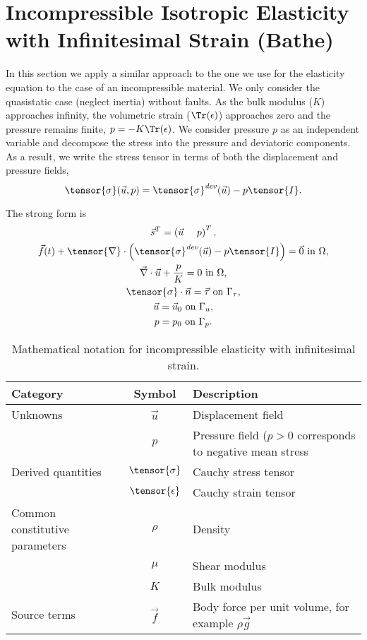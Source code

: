 \section{Incompressible Isotropic Elasticity with Infinitesimal Strain (Bathe)}

In this section we apply a similar approach to the one we use for the
elasticity equation to the case of an incompressible material. We only
consider the quasistatic case (neglect inertia) without faults. As the
bulk modulus ($K$) approaches infinity, the volumetric strain
($\Tr(\epsilon)$) approaches zero and the pressure remains finite,
$p = -K \Tr(\epsilon)$. We consider pressure $p$ as an independent
variable and decompose the stress into the pressure and deviatoric
components. As a result, we write the stress tensor in terms of both
the displacement and pressure fields,
\begin{equation}
  \tensor{\sigma}(\vec{u},p) = \tensor{\sigma}^\mathit{dev}(\vec{u}) - p\tensor{I}.
\end{equation}

The strong form is
\begin{gather}
  \vec{s}^T = \left( \vec{u} \quad \ p \right)^T, \\
  \vec{f}(t) + \tensor{\nabla} \cdot \left(\tensor{\sigma}^\mathit{dev}(\vec{u}) - p\tensor{I}\right) = \vec{0} \text{ in }\Omega, \\
  \vec{\nabla} \cdot \vec{u} + \frac{p}{K} = 0 \text{ in }\Omega, \\
  \tensor{\sigma} \cdot \vec{n} = \vec{\tau} \text{ on }\Gamma_\tau, \\
  \vec{u} = \vec{u}_0 \text{ on }\Gamma_u, \\
  p = p_0 \text{ on }\Gamma_p.
\end{gather}

\begin{table}[htbp]
  \caption{Mathematical notation for incompressible elasticity with
    infinitesimal strain.}
  \label{tab:notation:incompressible:elasticity}
  \begin{tabular}{lcp{3.5in}}
    \toprule
    {\bf Category} & {\bf Symbol} & {\bf Description} \\
    \midrule
    Unknowns & $\vec{u}$ & Displacement field \\
    & $p$ & Pressure field ($p>0$ corresponds to negative mean stress \\
    Derived quantities & $\tensor{\sigma}$ & Cauchy stress tensor \\
                   & $\tensor{\epsilon}$ & Cauchy strain tensor \\
    Common constitutive parameters & $\rho$ & Density \\
  & $\mu$ & Shear modulus \\
  & $K$ & Bulk modulus \\
Source terms & $\vec{f}$ & Body force per unit volume, for example $\rho \vec{g}$ \\
    \bottomrule
  \end{tabular}
\end{table}

